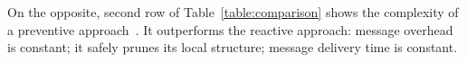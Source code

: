 

%     







On the opposite, second row of Table~\ref{table:comparison} shows the complexity
of a preventive approach~\cite{friedman2004causal}. It outperforms the reactive
approach: message overhead is constant; it safely prunes its local structure;
message delivery time is constant.

